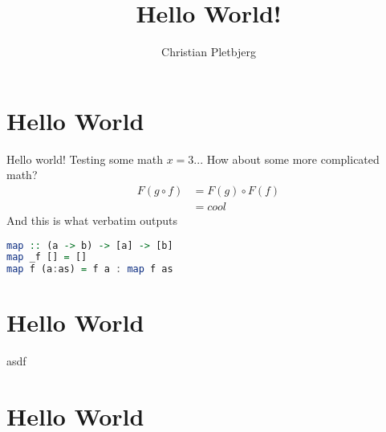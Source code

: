 \documentclass{article}
\title{Hello World!}
\author{Christian Pletbjerg}
\theoremstyle{plain}%
\theoremstyle{definition}
\theoremstyle{remark}
\begin{document}
\maketitle

\tableofcontents


\section{Hello World}
Hello world! Testing some math $x = 3$... How about some more complicated math?
\begin{align}
    F( g \circ f ) 
        &=  F( g ) \circ F (f )
        \\
        &=  cool
\end{align}
And this is what verbatim outputs
\begin{lstlisting}[language=Haskell]
map :: (a -> b) -> [a] -> [b]
map _f [] = []
map f (a:as) = f a : map f as
\end{lstlisting}

\section{Hello World}
asdf 
\section{Hello World}
\end{document}
